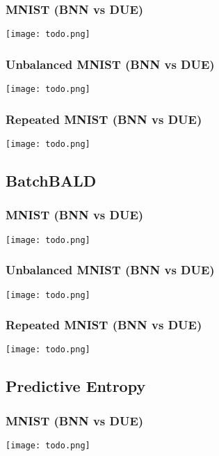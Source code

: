 \documentclass[12pt, a4paper]{report}
\theoremstyle{definition}
\begin{document}
\subsubsection{MNIST (BNN vs DUE)}

\texttt{[image: todo.png]}

\subsubsection{Unbalanced MNIST (BNN vs DUE)}

\texttt{[image: todo.png]}

\subsubsection{Repeated MNIST (BNN vs DUE)}

\texttt{[image: todo.png]}

\subsection{BatchBALD}

\subsubsection{MNIST (BNN vs DUE)}

\texttt{[image: todo.png]}

\subsubsection{Unbalanced MNIST (BNN vs DUE)}

\texttt{[image: todo.png]}

\subsubsection{Repeated MNIST (BNN vs DUE)}

\texttt{[image: todo.png]}


\subsection{Predictive Entropy}

\subsubsection{MNIST (BNN vs DUE)}

\texttt{[image: todo.png]}
\end{document}
